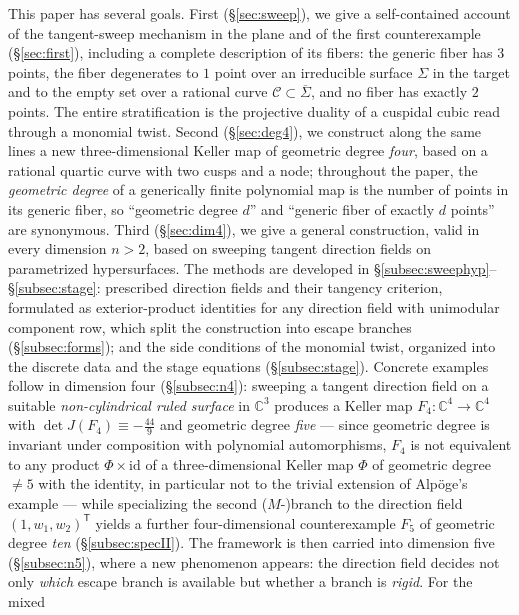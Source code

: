 \documentclass[11pt]{article}
\theoremstyle{plain}
\theoremstyle{definition}
\theoremstyle{remark}
\newcommand{\C}{\mathbb{C}}
\begin{document}
This paper has several goals. First (\S\ref{sec:sweep}), we give
a self-contained account of the tangent-sweep mechanism in the plane and of the
first counterexample (\S\ref{sec:first}), including a complete description of its
fibers: the generic
fiber has $3$ points, the fiber degenerates to $1$ point over an irreducible
surface $\Sigma$ in the target and to the empty set over a rational curve
$\mathcal{C}\subset\overline{\Sigma}$, and no fiber has exactly $2$ points. The
entire stratification is the projective duality of a cuspidal cubic read through a
monomial twist. Second (\S\ref{sec:deg4}), we construct along the same lines a new
three-dimensional Keller map of geometric degree \emph{four}, based on a rational
quartic curve with two cusps and a node; throughout the paper, the
\emph{geometric degree} of a generically finite polynomial map is the number of
points in its generic fiber, so ``geometric degree $d$'' and ``generic fiber of
exactly $d$ points'' are synonymous. Third (\S\ref{sec:dim4}), we give a general construction, valid in every
dimension $n>2$, based on sweeping tangent direction fields on parametrized
hypersurfaces. The methods are developed in
\S\ref{subsec:sweephyp}--\S\ref{subsec:stage}: prescribed direction fields and
their tangency criterion, formulated as exterior-product identities for any
direction field with unimodular component row, which split the construction
into escape branches (\S\ref{subsec:forms}); and the side conditions of the
monomial twist, organized into the discrete data and the stage equations
(\S\ref{subsec:stage}). Concrete examples follow in dimension four
(\S\ref{subsec:n4}): sweeping a tangent direction field on a suitable
\emph{non-cylindrical ruled surface} in $\C^3$ produces a Keller map
$F_4\colon\C^4\to\C^4$ with $\det J(F_4)\equiv-\tfrac{44}{9}$ and geometric
degree \emph{five} --- since geometric degree is invariant under composition
with polynomial automorphisms, $F_4$ is not equivalent to any product
$\Phi\times\mathrm{id}$ of a three-dimensional Keller map $\Phi$ of geometric
degree $\neq5$ with the identity, in particular not to the trivial extension
of Alp\"oge's example --- while specializing the second ($M$-)branch to the
direction field $(1,w_1,w_2)^{\mathsf T}$ yields a further four-dimensional
counterexample $F_5$ of geometric degree \emph{ten} (\S\ref{subsec:specII}).
The framework is then carried into dimension five (\S\ref{subsec:n5}), where a
new phenomenon appears: the direction field decides not only \emph{which}
escape branch is available but whether a branch is \emph{rigid}. For the mixed
\end{document}
